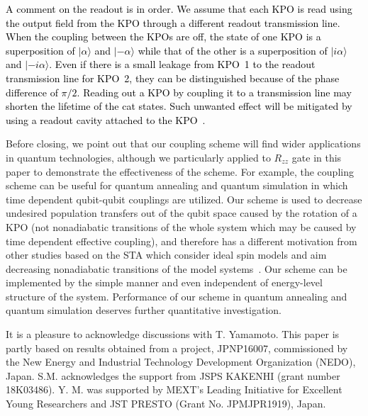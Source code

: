 \documentclass[%
 reprint,
 amsmath,amssymb,
 aps,
pra,
]{revtex4-2}
\begin{document}
\textcolor{black}{A comment on the readout is in order. 
We assume that each KPO is read using the output field from the KPO through a different readout transmission line. When the coupling between the KPOs are off, the state of one KPO is a superposition of $|\alpha\rangle$ and $|-\alpha\rangle$ while that of the other is a superposition of $|i\alpha\rangle$ and $|-i\alpha\rangle$. Even if there is a small leakage from KPO~1 to the readout transmission line for KPO~2, they can be distinguished because of the phase difference of $\pi/2$.}
\textcolor{black}{Reading out a KPO by coupling it to a transmission line may shorten the lifetime of the cat states. Such unwanted effect will be mitigated by using a readout cavity attached to the KPO~\cite{Grimm2020}.
}

Before closing, we point out that our coupling scheme will find wider applications in quantum technologies, although we particularly applied to $R_{zz}$ gate in this paper to demonstrate the effectiveness of the scheme.
For example, the coupling scheme can be useful for quantum annealing and quantum simulation in which time dependent qubit-qubit couplings are utilized.
Our scheme is used to decrease undesired population transfers out of the qubit space caused by the rotation of a KPO (not nonadiabatic transitions of the whole system which may be caused by time dependent effective coupling), and therefore has a different motivation from other studies based on the STA which consider ideal spin models and aim decreasing nonadiabatic transitions of the model systems~\cite{delCampo2012,Damski2014,Okuyama2016,Sels2017,Setiawan2019}.
Our scheme can be implemented by the simple manner and even independent of energy-level structure of the system. Performance of our scheme in quantum annealing and quantum simulation deserves further quantitative investigation. 


\begin{acknowledgments}
It is a pleasure to acknowledge discussions with T. Yamamoto.
This paper is partly based on results obtained from a project, JPNP16007, commissioned by the New Energy and Industrial Technology Development Organization (NEDO), Japan. 
S.M. acknowledges the support from JSPS KAKENHI (grant number 18K03486). 
Y. M. was supported by MEXT's Leading Initiative for Excellent Young Researchers and JST PRESTO (Grant No. JPMJPR1919), Japan.
\end{acknowledgments}
\end{document}
